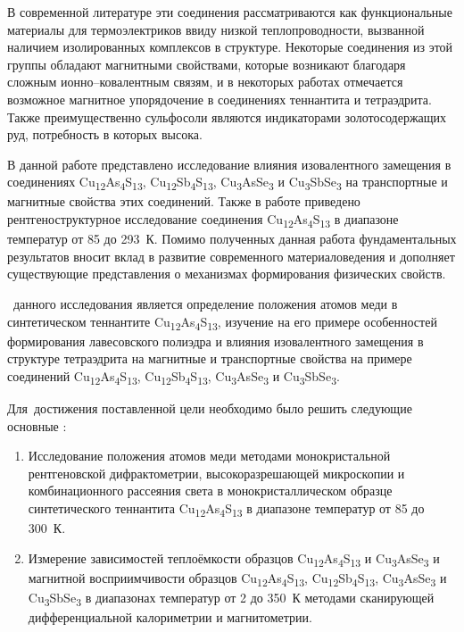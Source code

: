В современной литературе эти соединения рассматриваются как функциональные материалы для термоэлектриков ввиду низкой теплопроводности, вызванной наличием изолированных комплексов в структуре.
Некоторые соединения из этой группы обладают магнитными свойствами, которые возникают благодаря сложным ионно--ковалентным связям, и в некоторых работах отмечается возможное магнитное упорядочение в соединениях теннантита и тетраэдрита.
Также преимущественно сульфосоли являются индикаторами золотосодержащих руд, потребность в которых высока.

В данной работе представлено исследование влияния изовалентного замещения в соединениях Cu\textsubscript{12}As\textsubscript{4}S\textsubscript{13}, Cu\textsubscript{12}Sb\textsubscript{4}S\textsubscript{13}, Cu\textsubscript{3}AsSe\textsubscript{3} и Cu\textsubscript{3}SbSe\textsubscript{3} на транспортные и магнитные свойства этих соединений.
Также в работе приведено рентгеноструктурное исследование соединения  Cu\textsubscript{12}As\textsubscript{4}S\textsubscript{13} в диапазоне температур от 85 до 293~К.  Помимо полученных данная работа фундаментальных результатов вносит вклад в развитие современного материаловедения и дополняет существующие представления о механизмах формирования физических свойств.

 \aim\ данного исследования является определение положения атомов меди в синтетическом теннантите
 Cu\textsubscript{12}As\textsubscript{4}S\textsubscript{13}, изучение на его примере особенностей формирования лавесовского полиэдра и влияния изовалентного замещения в структуре тетраэдрита на магнитные и транспортные свойства на примере соединений  Cu\textsubscript{12}As\textsubscript{4}S\textsubscript{13}, Cu\textsubscript{12}Sb\textsubscript{4}S\textsubscript{13}, Cu\textsubscript{3}AsSe\textsubscript{3} и Cu\textsubscript{3}SbSe\textsubscript{3}.

Для~достижения поставленной цели необходимо было решить следующие основные {\tasks}:
\begin{enumerate}
  \item Исследование положения атомов меди методами монокристальной	 рентгеновской дифрактометрии, высокоразрешающей микроскопии и комбинационного рассеяния света в монокристаллическом образце синтетического теннантита Cu\textsubscript{12}As\textsubscript{4}S\textsubscript{13} в диапазоне температур от 85 до 300~К.
  \item Измерение зависимостей теплоёмкости образцов Cu\textsubscript{12}As\textsubscript{4}S\textsubscript{13} и Cu\textsubscript{3}AsSe\textsubscript{3} и магнитной восприимчивости  образцов Cu\textsubscript{12}As\textsubscript{4}S\textsubscript{13}, Cu\textsubscript{12}Sb\textsubscript{4}S\textsubscript{13}, Cu\textsubscript{3}AsSe\textsubscript{3} и Cu\textsubscript{3}SbSe\textsubscript{3} в диапазонах температур от 2  до 350~К методами сканирующей дифференциальной калориметрии и магнитометрии.

\end{enumerate}

